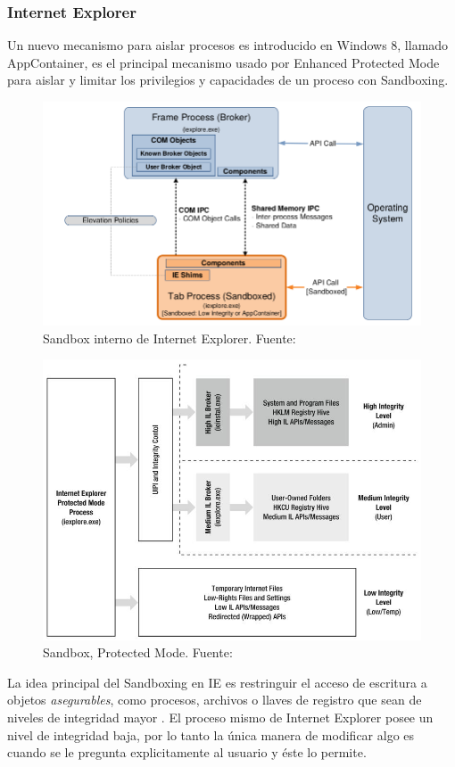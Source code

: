     \subsubsection{Internet Explorer}
        Un nuevo mecanismo para aislar procesos es introducido en Windows 8, llamado AppContainer, es el principal mecanismo usado por Enhanced Protected Mode para aislar y limitar los privilegios y capacidades de un proceso con Sandboxing.
        \begin{figure}[h!t]
            \centering
            \includegraphics[scale=0.5]{figures/sandboxIE.png}
            \caption{Sandbox interno de Internet Explorer. Fuente: \cite{Yason}}
            \label{fig:SandboxIE}
        \end{figure}

        \begin{figure}[h!t]
            \centering
            \includegraphics[scale=0.5]{figures/IEProtectedMode.jpg}
            \caption{Sandbox, Protected Mode. Fuente: \cite{Crowley2010}}
            \label{fig:SandboxIE2}
        \end{figure}
        La idea principal del Sandboxing en IE es restringuir el acceso de escritura a objetos \textit{asegurables}, como procesos, archivos o llaves de registro que sean de niveles de integridad mayor \cite{Colvin2010}. El proceso mismo de Internet Explorer posee un nivel de integridad baja, por lo tanto la única manera de modificar algo es cuando se le pregunta explicitamente al usuario y éste lo permite.



